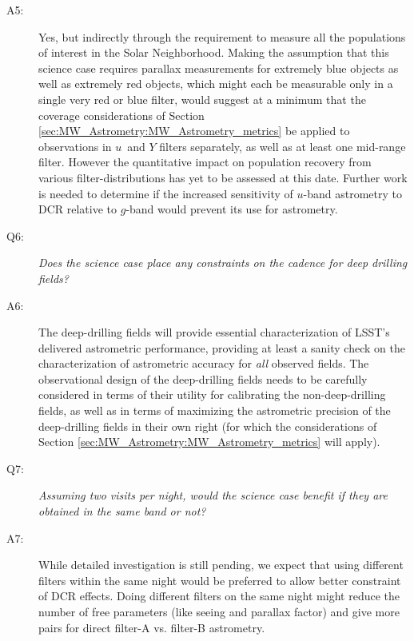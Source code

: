\begin{description}
\item[A5:] Yes, but indirectly through the requirement to
  measure all the populations of interest in the Solar
  Neighborhood. Making the assumption that this science case requires
  parallax measurements for extremely blue objects as well as
  extremely red objects, which might each be measurable only in a
  single very red or blue filter, would suggest at a minimum that the
  coverage considerations of Section
  \ref{sec:MW_Astrometry:MW_Astrometry_metrics} be applied to
  observations in $u$~and $Y$ filters separately, as well as at least
  one mid-range filter. However the quantitative impact on population
  recovery from various filter-distributions has yet to be assessed at
  this date. Further work is needed to determine if the increased
  sensitivity of $u$-band astrometry to DCR relative to $g$-band would
  prevent its use for astrometry.

\item[Q6:] {\it Does the science case place any constraints on the
cadence for deep drilling fields?}

\item[A6:] The deep-drilling fields will provide essential characterization of LSST's delivered astrometric performance, providing at least a sanity check on the characterization of astrometric accuracy for {\it all} observed fields. The observational design of the deep-drilling fields needs to be carefully considered in terms of their utility for calibrating the non-deep-drilling fields, as well as in terms of maximizing the astrometric precision of the deep-drilling fields in their own right (for which the considerations of Section \ref{sec:MW_Astrometry:MW_Astrometry_metrics} will apply).


\item[Q7:] {\it Assuming two visits per night, would the science case
benefit if they are obtained in the same band or not?}

\item[A7:] While detailed investigation is still pending, we
  expect that using different filters within the same night would be
  preferred to allow better constraint of DCR effects. Doing different
  filters on the same night might reduce the number of free parameters
  (like seeing and parallax factor) and give more pairs for direct
  filter-A vs. filter-B astrometry.


\end{description}
